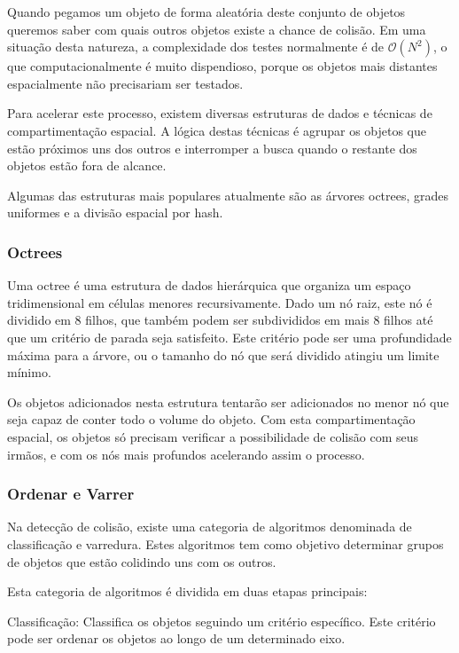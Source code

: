 Quando pegamos um objeto de forma aleatória deste conjunto de objetos queremos saber com quais outros objetos
existe a chance de colisão.
Em uma situação desta natureza, a complexidade dos testes normalmente é de $\mathcal{O}(N^2)$, o que
computacionalmente é muito dispendioso, porque os objetos mais distantes
espacialmente não precisariam ser testados.

Para acelerar este processo, existem diversas estruturas de dados e técnicas de compartimentação espacial.
A lógica destas técnicas é agrupar os objetos que estão próximos uns dos outros
e interromper a busca quando o restante dos objetos estão fora de alcance.

Algumas das estruturas mais populares atualmente são as árvores octrees, grades
uniformes e a divisão espacial por hash.

\subsubsection{Octrees}

Uma octree é uma estrutura de dados hierárquica que organiza um espaço
tridimensional em células menores recursivamente.
Dado um nó raiz, este nó é dividido em 8  filhos, que também podem ser
subdivididos em mais 8 filhos até que um critério de parada seja satisfeito.
Este critério pode ser uma profundidade máxima para a árvore, ou o tamanho do
nó que será dividido atingiu um limite mínimo.

Os objetos adicionados nesta estrutura tentarão ser adicionados no menor nó que
seja capaz de conter todo o volume do objeto. Com esta compartimentação
espacial, os objetos só precisam verificar a possibilidade de colisão com seus
irmãos, e com os nós mais profundos acelerando assim o processo.

\subsubsection{Ordenar e Varrer}

Na detecção de colisão, existe uma categoria de algoritmos denominada de
classificação e varredura. Estes algoritmos tem como objetivo determinar grupos
de objetos que estão colidindo uns com os outros.

Esta categoria de algoritmos é dividida em duas etapas principais:

Classificação: Classifica os objetos seguindo um critério específico. Este
critério pode ser ordenar os objetos ao longo de um determinado eixo.

